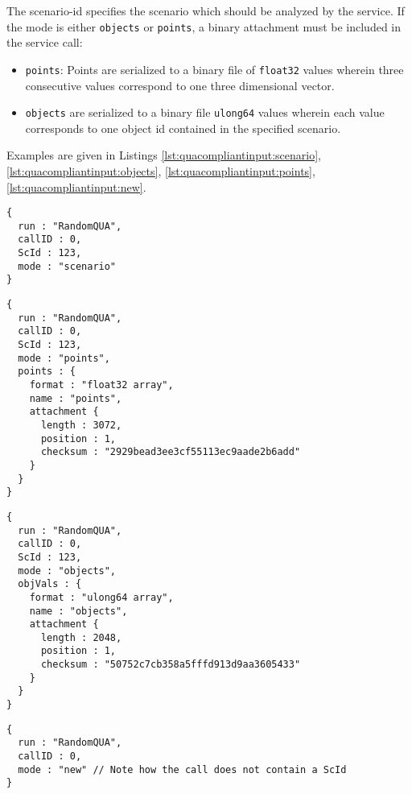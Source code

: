 The scenario-id specifies the scenario which should be analyzed by the service. If the mode is either \texttt{objects} or \texttt{points}, a binary attachment must be included in the service call:
\begin{itemize}
  \item \texttt{points}: Points are serialized to a binary file of \texttt{float32} values wherein three consecutive values correspond to one three dimensional vector.
  \item \texttt{objects} are serialized to a binary file \texttt{ulong64} values wherein each value corresponds to one object id contained in the specified scenario.
\end{itemize}

Examples are given in Listings \ref{lst:quacompliantinput:scenario}, \ref{lst:quacompliantinput:objects}, \ref{lst:quacompliantinput:points}, \ref{lst:quacompliantinput:new}.

\begin{lstlisting}[caption={A qua-compliant service run request for mode \texttt{scenario}}, label={lst:quacompliantinput:scenario}]
{
  run : "RandomQUA",
  callID : 0,
  ScId : 123,
  mode : "scenario"
}
\end{lstlisting}

\begin{lstlisting}[caption={A qua-compliant service run request for mode \texttt{points}}, label={lst:quacompliantinput:points}]
{
  run : "RandomQUA",
  callID : 0,
  ScId : 123,
  mode : "points",
  points : {
    format : "float32 array",
    name : "points",
    attachment {
      length : 3072,
      position : 1,
      checksum : "2929bead3ee3cf55113ec9aade2b6add"
    }
  }
}
\end{lstlisting}

\begin{lstlisting}[caption={A qua-compliant service run request for mode \texttt{objects}}, label={lst:quacompliantinput:objects}]
{
  run : "RandomQUA",
  callID : 0,
  ScId : 123,
  mode : "objects",
  objVals : {
    format : "ulong64 array",
    name : "objects",
    attachment {
      length : 2048,
      position : 1,
      checksum : "50752c7cb358a5fffd913d9aa3605433"
    }
  }
}
\end{lstlisting}


\begin{lstlisting}[caption={A qua-compliant service run request for mode \texttt{new}}, label={lst:quacompliantinput:new}]
{
  run : "RandomQUA",
  callID : 0,
  mode : "new" // Note how the call does not contain a ScId
}
\end{lstlisting}

